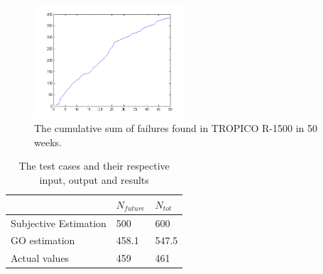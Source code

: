 \begin{figure}[htb!]
\begin{center}
	\includegraphics[width=0.5\textwidth]{cumsumgodata1plot.png}
\caption{The cumulative sum of failures found in TROPICO R-1500 in 50 weeks.}
\end{center}
\label{cumulativegodata1}
\end{figure}

\begin{table}[!htb]
	\centering
	\caption{The test cases and their respective input, output and results}
	\label{goelokumototable}	
    \begin{tabular}{|l|l|l|}
        \hline
        ~ & $N_{future}$ & $N_{tot}$ \\ \hline
        Subjective Estimation            & 500   & 600 		\\ 
        GO estimation                    & 458.1 & 547.5	\\ 
        Actual values                    & 459 	 & 461		\\ 
        \hline
    \end{tabular}
\end{table}